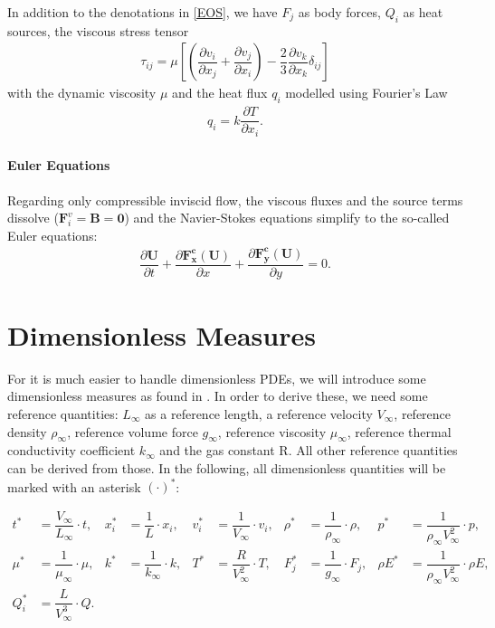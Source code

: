 		In addition to the denotations in \cref{EOS}, we have $F_j$ as body forces, $Q_i$ as heat sources, the viscous stress tensor
		\begin{align}
			\tau_{ij} = \mu \left[\left(\dfrac{\partial v_i}{\partial x_j} + \dfrac{\partial v_j}{\partial x_i} \right) - \dfrac{2}{3} \dfrac{\partial v_k}{\partial x_k} \delta_{ij}\right]
		\end{align}
		with the dynamic viscosity $\mu$ and the heat flux $q_i$ modelled using Fourier's Law
		\begin{align}
			q_i = k \dfrac{\partial T}{\partial x_i}.
		\end{align}
		
			\paragraph{Euler Equations}
			Regarding only compressible inviscid flow, the viscous fluxes and the source terms dissolve ($\mathbf{F}_i^v = \mathbf{B} = \mathbf{0}$) and the Navier-Stokes equations simplify to the so-called Euler equations: 
			\begin{align}
				\dfrac{\partial \mathbf{U}}{\partial t} + \dfrac{\partial \mathbf{F_x^c(U)}}{\partial x} + \dfrac{\partial \mathbf{F_y^c(U)}}{\partial y} = 0.
			\end{align}
	
	
	\section{Dimensionless Measures}
	For it is much easier to handle dimensionless PDEs, we will introduce some dimensionless measures as found in \textcite{annualreport}. In order to derive these, we need some reference quantities: $L_\infty$ as a reference length, a reference velocity $V_\infty$, reference density $\rho_\infty$, reference volume force $g_\infty$, reference viscosity $\mu_\infty$, reference thermal conductivity coefficient $k_\infty$ and the gas constant R. All other reference quantities can be derived from those. In the following, all dimensionless quantities will be marked with an asterisk $(\cdot)^*$:
	
	\begin{align}
		t^* &= \dfrac{V_\infty}{L_\infty} \cdot t,& x_i^* &= \dfrac{1}{L} \cdot x_i, & v_i^* &= \dfrac{1}{V_\infty}\cdot v_i, & \rho^* &= \dfrac{1}{\rho_\infty} \cdot \rho, & p^* &= \dfrac{1}{\rho_\infty V_\infty^2} \cdot p, \\ \nonumber
		 \mu^* &= \dfrac{1}{\mu_\infty} \cdot \mu , & k^* &= \dfrac{1}{k_\infty} \cdot k,&  T^* &= \dfrac{R}{V_\infty^2}\cdot T, & F_j^*& = \dfrac{1}{g_\infty} \cdot F_j, & \rho E^* &= \dfrac{1}{\rho_\infty V_\infty^2} \cdot \rho E, \\ \nonumber
		 Q_i^* &= \dfrac{L}{V_\infty^3} \cdot Q. &
	\end{align}
	
